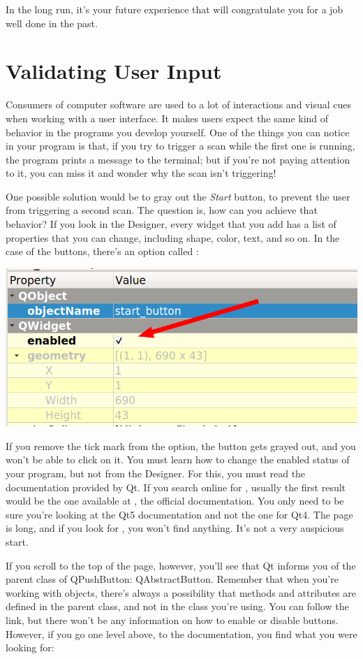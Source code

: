 In the long run, it's your future experience that will congratulate you for a job well done in the past.

\section{Validating User Input}\label{sec:validating-user-input}
Consumers of computer software are used to a lot of interactions and visual cues when working with a user interface. It makes users expect the same kind of behavior in the programs you develop yourself. One of the things you can notice in your program is that, if you try to trigger a scan while the first one is running, the program prints a message to the terminal; but if you're not paying attention to it, you can miss it and wonder why the scan isn't triggering!

One possible solution would be to gray out the \emph{Start} button, to prevent the user from triggering a second scan. The question is, how can you achieve that behavior? If you look in the Designer, every widget that you add has a list of properties that you can change, including shape, color, text, and so on. In the case of the buttons, there's an option called :

\begin{center}
    \includegraphics[width=.4\linewidth]{images/Chapter_09/10_enabled_button.png}
\end{center}

If you remove the tick mark from the option, the button gets grayed out, and you won't be able to click on it. You must learn how to change the enabled status of your program, but not from the Designer. For this, you must read the documentation provided by Qt. If you search online for , usually the first result would be the one available at , the official documentation. You only need to be sure you're looking at the Qt5 documentation and not the one for Qt4. The page is long, and if you look for , you won't find anything. It's not a very auspicious start.

If you scroll to the top of the page, however, you'll see that Qt informs you of the parent class of QPushButton: QAbstractButton. Remember that when you're working with objects, there's always a possibility that methods and attributes are defined in the parent class, and not in the class you're using. You can follow the link, but there won't be any information on how to enable or disable buttons. However, if you go one level above, to the  documentation, you find what you were looking for:

